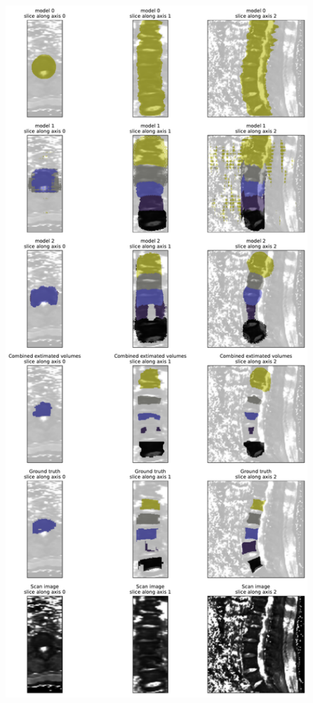 \begin{figure}
    \centering
    \includegraphics[width=.90\textwidth]{images/comb1_denoise2_erode1_MyoSegmenTUM_036.pdf}
    \caption{
}
\end{figure}
